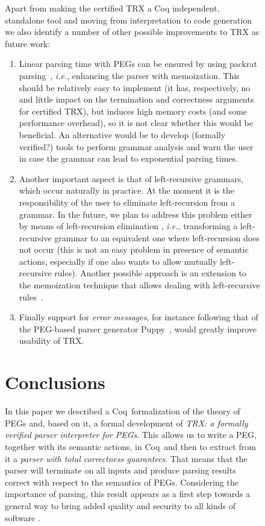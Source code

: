 \documentclass{LMCS}
\newcommand{\coq}{Coq}
\newcommand{\TRX}{TRX}
\newcommand{\ie}{\textit{i.e.}}
\theoremstyle{definition}
\begin{document}
\begin{figure}[t!]
\begin{center}
\bigskip
Apart from making the certified TRX a Coq independent, standalone tool and moving
from interpretation to code generation we also identify a number of other possible 
improvements to TRX as future work:

\begin{enumerate}[(1)]
 \item\label{future:performance} 
   Linear parsing time with PEGs can be ensured by using packrat parsing~\cite{For02},
   \ie, enhancing the parser with memoization. This should be relatively easy to 
   implement (it has, respectively, no and little impact on the termination and 
   correctness arguments for certified TRX), but induces high memory costs
   (and some performance overhead), so it is not clear whether this would be 
   beneficial. An alternative would be to develop (formally verified?) tools
   to perform grammar analysis and warn the user in case the grammar can lead to
   exponential parsing times.

 \item Another important aspect is that of left-recursive grammars, which
   occur naturally in practice. At the moment it is the responsibility of
   the user to eliminate left-recursion from a grammar. In the future, we
   plan to address this problem either by means of left-recursion elimination
   \cite{For02mth}, \ie, transforming a left-recursive grammar to an equivalent 
   one where left-recursion does not occur (this is not an easy problem in 
   presence of semantic actions, especially if one also wants to allow mutually 
   left-recursive rules). Another possible approach is an extension to the 
   memoization technique that allows dealing with left-recursive rules~\cite{WarEA08}.

 \item\label{future:errmsg}
   Finally support for \emph{error messages}, for instance following that of
   the PEG-based parser generator Puppy~\cite{For02mth}, would greatly
   improve usability of TRX.
\end{enumerate}
\section{Conclusions}\label{sec:concl}

In this paper we described a \coq\ formalization of the theory of PEGs and,
based on it, a formal development of \emph{\TRX: a formally verified parser 
interpreter for PEGs}. This allows us to write a PEG, together with its 
semantic actions, in \coq\ and then to extract from it a \emph{parser with 
total correctness guarantees}. That means that the parser will terminate 
on all inputs and produce parsing results correct with respect to the 
semantics of PEGs. 
Considering the importance of parsing, this result appears as a first step 
towards a general way to bring added quality and security to all kinds of software .


\end{center}
\end{figure}
\end{document}
